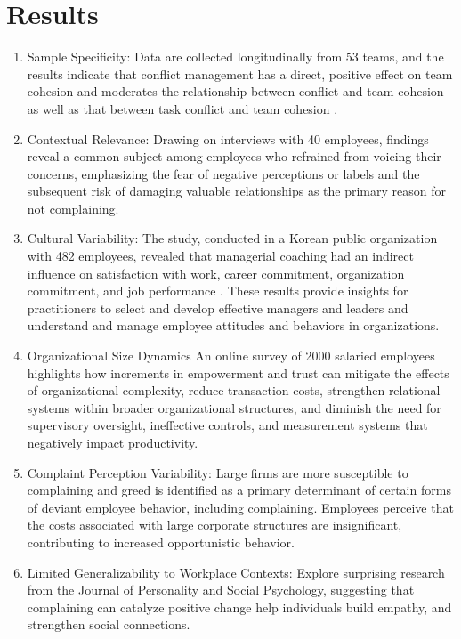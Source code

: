 \documentclass[a4paper,12pt]{article}
\begin{document}
\section{Results}
\begin{enumerate}
    \item Sample Specificity: Data are collected longitudinally from 53 teams, and the results indicate that conflict management has a direct, positive effect on team cohesion and moderates the relationship between conflict and team cohesion as well as that between task conflict and team cohesion \cite{conflict_management}. 
    \item Contextual Relevance: Drawing on interviews with 40 employees,  findings reveal a common subject among employees who refrained from voicing their concerns, emphasizing the fear of negative perceptions or labels and the subsequent risk of damaging valuable relationships as the primary reason for not complaining\cite{employee_silence}.
    \item Cultural Variability: The study, conducted in a Korean public organization with 482 employees, revealed that managerial coaching had an indirect influence on satisfaction with work, career commitment, organization commitment, and job performance \cite{managerial_coaching}. These results provide insights for practitioners to select and develop effective managers and leaders and understand and manage employee attitudes and behaviors in organizations.
    \item Organizational Size Dynamics An online survey of 2000 salaried employees highlights how increments in empowerment and trust can mitigate the effects of organizational complexity, reduce transaction costs, strengthen relational systems within broader organizational structures, and diminish the need for supervisory oversight, ineffective controls, and measurement systems that negatively impact productivity\cite{employee_manager}.
    \item Complaint Perception Variability: Large firms are more susceptible to complaining and greed is identified as a primary determinant of certain forms of deviant employee behavior, including complaining. Employees perceive that the costs associated with large corporate structures are insignificant, contributing to increased opportunistic behavior\cite{opportunistic_complain}.
    \item Limited Generalizability to Workplace Contexts: Explore surprising research from the Journal of Personality and Social Psychology, suggesting that complaining can catalyze positive change help individuals build empathy, and strengthen social connections\cite{benefits_complain}.
\end{enumerate}
\end{document}

